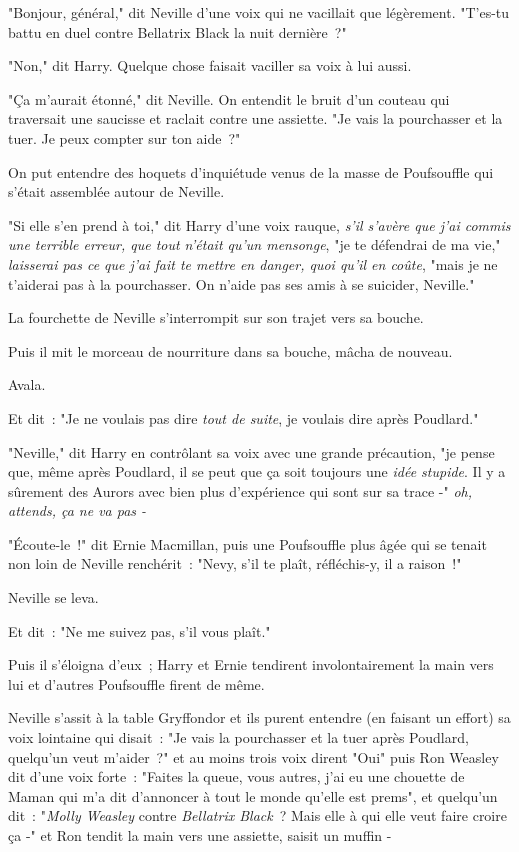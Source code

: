 "Bonjour, général," dit Neville d'une voix qui ne vacillait que légèrement. "T'es-tu battu en duel contre Bellatrix Black la nuit dernière~?"

"Non," dit Harry. Quelque chose faisait vaciller sa voix à lui aussi.

"Ça m'aurait étonné," dit Neville. On entendit le bruit d'un couteau qui traversait une saucisse et raclait contre une assiette. "Je vais la pourchasser et la tuer. Je peux compter sur ton aide~?"

On put entendre des hoquets d'inquiétude venus de la masse de Poufsouffle qui s'était assemblée autour de Neville.

"Si elle s'en prend à toi," dit Harry d'une voix rauque, \emph{s'il s'avère que j'ai commis une terrible erreur, que tout n'était qu'un mensonge}, "je te défendrai de ma vie," \emph{laisserai pas ce que j'ai fait te mettre en danger, quoi qu'il en coûte}, "mais je ne t'aiderai pas à la pourchasser. On n'aide pas ses amis à se suicider, Neville."

La fourchette de Neville s'interrompit sur son trajet vers sa bouche.

Puis il mit le morceau de nourriture dans sa bouche, mâcha de nouveau.

Avala.

Et dit~: "Je ne voulais pas dire \emph{tout de suite}, je voulais dire après Poudlard."

"Neville," dit Harry en contrôlant sa voix avec une grande précaution, "je pense que, même après Poudlard, il se peut que ça soit toujours une \emph{idée stupide}. Il y a sûrement des Aurors avec bien plus d'expérience qui sont sur sa trace -" \emph{oh, attends, ça ne va pas -}

"Écoute-le~!" dit Ernie Macmillan, puis une Poufsouffle plus âgée qui se tenait non loin de Neville renchérit~: "Nevy, s'il te plaît, réfléchis-y, il a raison~!"

Neville se leva.

Et dit~: "Ne me suivez pas, s'il vous plaît."

Puis il s'éloigna d'eux~; Harry et Ernie tendirent involontairement la main vers lui et d'autres Poufsouffle firent de même.

Neville s'assit à la table Gryffondor et ils purent entendre (en faisant un effort) sa voix lointaine qui disait~: "Je vais la pourchasser et la tuer après Poudlard, quelqu'un veut m'aider~?" et au moins trois voix dirent "Oui" puis Ron Weasley dit d'une voix forte~: "Faites la queue, vous autres, j'ai eu une chouette de Maman qui m'a dit d'annoncer à tout le monde qu'elle est prems", et quelqu'un dit~: "\emph{Molly Weasley} contre \emph{Bellatrix Black}~? Mais elle à qui elle veut faire croire ça -" et Ron tendit la main vers une assiette, saisit un muffin -

